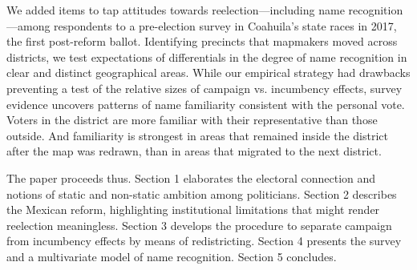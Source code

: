 \documentclass[letter,12pt]{article}
\begin{document}
We added items to tap attitudes towards reelection---including name recognition \citep[cf.][]{cain.etal.1987}---among respondents to a pre-election survey in Coahuila's state races in 2017, the first post-reform ballot. Identifying precincts that mapmakers moved across districts, we test expectations of differentials in the degree of name recognition in clear and distinct geographical areas. While our empirical strategy had drawbacks preventing a test of the relative sizes of campaign vs. incumbency effects, survey evidence uncovers patterns of name familiarity consistent with the personal vote. Voters in the district are more familiar with their representative than those outside. And familiarity is strongest in areas that remained inside the district after the map was redrawn, than in areas that migrated to the next district.  

The paper proceeds thus. Section 1 elaborates the electoral connection and notions of static and non-static ambition among politicians. Section 2 describes the Mexican reform, highlighting institutional limitations that might render reelection meaningless. Section 3 develops the procedure to separate campaign from incumbency effects by means of redistricting. Section 4 presents the survey and a multivariate model of name recognition. Section 5 concludes.  



\end{document}
